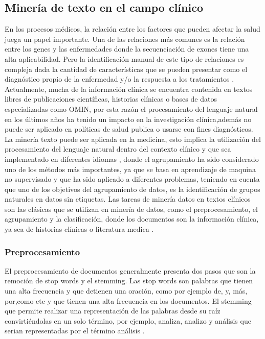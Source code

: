 \subsection{Minería de texto en el campo clínico}

En los procesos médicos, la relación entre los factores que pueden afectar la salud juega un papel importante. Una de las relaciones más comunes es la relación entre los genes y las enfermedades donde la secuenciación de exones tiene una alta aplicabilidad. Pero la identificación manual de este tipo de relaciones es compleja dada la cantidad de características que se pueden presentar como el diagnóstico propio de la enfermedad y/o la respuesta a los tratamientos \cite{Kawashima2017}.\\

Actualmente, mucha de la información clínica se encuentra contenida en textos libres de publicaciones científicas, historias clínicas o bases de datos especializadas como OMIN, por esta razón el procesamiento del lenguaje natural en los últimos años ha tenido un impacto en la investigación clínica,además no puede ser aplicado en políticas de salud publica o usarse con fines diagnósticos. \cite{Neveol2014}\\

La minería texto puede ser aplicada en la medicina, esto implica la utilización del procesamiento del lenguaje natural dentro del contexto clínico y que sea implementado en diferentes idiomas \cite{Neveol2014}, donde el agrupamiento ha sido considerado uno de los métodos más importantes, ya que se basa en aprendizaje de maquina no supervisado y que ha sido aplicado a diferentes problemas\cite{Kawashima2017}, teniendo en cuenta que uno de los objetivos del agrupamiento de datos, es la  identificación de grupos naturales en datos sin etiquetas. Las tareas de minería datos en textos clínicos son las clásicas que se utilizan en minería de datos, como el preprocesamiento, el agrupamiento y la clasificación, donde los documentos son la información clínica, ya sea de historias clínicas o literatura medica \cite{Jain2010,Renganathan2017}.


\subsubsection{Preprocesamiento}

El preprocesamiento de documentos generalmente presenta dos pasos que son la remoción de stop words y el stemming. Las stop words son palabras que tienen una alta frecuencia y  que detienen una oración, como por ejemplo de, y, más, por,como etc y que tienen una alta frecuencia en los documentos. El stemming  que permite realizar una representación de las palabras desde su raíz convirtiéndolas en un solo término, por ejemplo, analiza, analizo y análisis que serian representadas por el término análisis \cite{Renganathan2017}.\\

